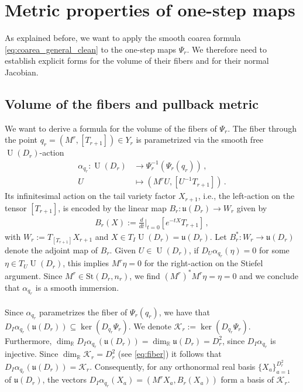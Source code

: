 \documentclass{article}
\theoremstyle{definition}
\DeclareMathOperator{\U}{U}
\newcommand{\St}{\mathrm{St}}
\begin{document}
\section{Metric properties of one-step maps}\label{sec:NJ_fiber_volume}

As explained before, we want to apply the smooth coarea formula \eqref{eq:coarea_general_clean} to the one-step maps $\Psi_r$. We therefore need to establish explicit forms for the volume of their fibers and for their normal Jacobian. 





\subsection{Volume of the fibers and pullback metric}
We want to derive a formula for the volume of the fibers of $\Psi_r$. The fiber through the point $q_r=(M^r,[T_{r+1}]) \in Y_r$ is parametrized via the smooth free $\U(D_r)$-action
\begin{align*}
\alpha_{q_r}:\U(D_r)&\longrightarrow  \Psi_r^{-1}(\Psi_r(q_r)) \, ,\\
U\quad &\longmapsto (M^rU,[U^{-1}T_{r+1}])\, .
\end{align*}
Its infinitesimal action on the tail variety factor $X_{r+1}$, i.e., the left-action on the tensor $[T_{r+1}]$, is encoded by the linear map $B_r:\mathfrak u(D_r)\longrightarrow W_r $ given by 
\begin{align}\label{eq:B_r_definition}
    B_r(X) :=  \frac{d}{dt}\bigg|_{t=0}
[e^{-tX}T_{r+1}]\,,
\end{align}
with $W_r := T_{[T_{r+1}]}X_{r+1}$ and $X\in T_{I}\U(D_r) = \mathfrak{u}(D_r)$. Let $B_r^*:W_r\to \mathfrak u(D_r)$ denote the adjoint map of \(B_r\). Given $U \in \U(D_r)$, if $D_U\alpha_{q_r}(\eta)=0$ for some $\eta \in T_U\U(D_r)$, this implies $M^r\eta=0$ for the right-action on the Stiefel argument. Since $M^r \in \St(D_r,n_r)$, we find $(M^r)^*M^r\eta = \eta =0$ and we conclude that $\alpha_{q_r}$ is a smooth immersion.
\\~\\
Since $\alpha_{q_r}$ parametrizes the fiber of $\Psi_r(q_r)$, we have that $D_I\alpha_{q_r}(\mathfrak u(D_r))
\subseteq
\ker(D_{q_r}\Psi_r)$. We denote $\mathcal K_r := \ker(D_{q_r}\Psi_r)$. 
Furthermore, $\dim_{\mathbb R}D_I\alpha_{q_r}(\mathfrak u(D_r))
=
\dim_{\mathbb R}\mathfrak u(D_r)
=
D_r^2$, since $D_I\alpha_{q_r}$ is injective. Since $\dim_{\mathbb R}\mathcal K_r=D_r^2$ (see \eqref{eq:fiber}) it follows that $D_I\alpha_{q_r}(\mathfrak u(D_r)) 
=
\mathcal K_r$. Consequently, for any orthonormal real basis
$\{X_a\}_{a=1}^{D_r^2}$ of $\mathfrak u(D_r)$, the vectors $D_I\alpha_{q_r}(X_a)
=
(M^rX_a,B_r(X_a))$
form a basis of $\mathcal K_r$. \\
\end{document}
